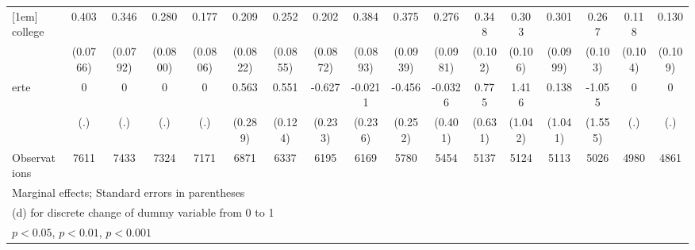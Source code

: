 {\begin{tabular}{l*{16}{c}}
[1em]
college             &       0.403\sym{***}&       0.346\sym{***}&       0.280\sym{***}&       0.177\sym{*}  &       0.209\sym{*}  &       0.252\sym{**} &       0.202\sym{*}  &       0.384\sym{***}&       0.375\sym{***}&       0.276\sym{**} &       0.348\sym{***}&       0.303\sym{**} &       0.301\sym{**} &       0.267\sym{**} &       0.118         &       0.130         \\
                    &    (0.0766)         &    (0.0792)         &    (0.0800)         &    (0.0806)         &    (0.0822)         &    (0.0855)         &    (0.0872)         &    (0.0893)         &    (0.0939)         &    (0.0981)         &     (0.102)         &     (0.106)         &    (0.0999)         &     (0.103)         &     (0.104)         &     (0.109)         \\
[1em]
erte                &           0         &           0         &           0         &           0         &       0.563         &       0.551\sym{***}&      -0.627\sym{**} &     -0.0211         &      -0.456         &     -0.0326         &       0.775         &       1.416         &       0.138         &      -1.055         &           0         &           0         \\
                    &         (.)         &         (.)         &         (.)         &         (.)         &     (0.289)         &     (0.124)         &     (0.233)         &     (0.236)         &     (0.252)         &     (0.401)         &     (0.631)         &     (1.042)         &     (1.041)         &     (1.555)         &         (.)         &         (.)         \\
\hline
Observations        &        7611         &        7433         &        7324         &        7171         &        6871         &        6337         &        6195         &        6169         &        5780         &        5454         &        5137         &        5124         &        5113         &        5026         &        4980         &        4861         \\
\hline\hline
\multicolumn{17}{l}{\footnotesize Marginal effects; Standard errors in parentheses}\\
\multicolumn{17}{l}{\footnotesize  (d) for discrete change of dummy variable from 0 to 1}\\
\multicolumn{17}{l}{\footnotesize \sym{*} \(p<0.05\), \sym{**} \(p<0.01\), \sym{***} \(p<0.001\)}\\
\end{tabular}
}
